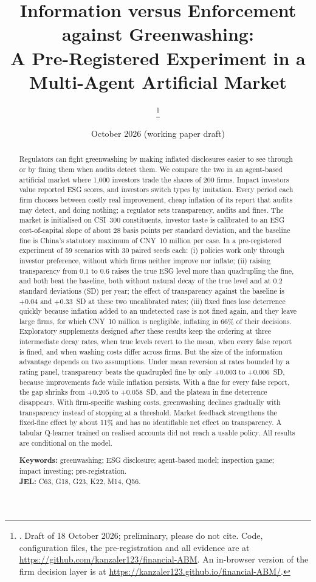 \documentclass[11pt]{article}
\title{Information versus Enforcement against Greenwashing:\\[2pt]
A Pre-Registered Experiment in a Multi-Agent Artificial Market}
\author{\fillin{Author name}\thanks{\fillin{Affiliation and e-mail}. Draft of 18 October 2026; preliminary, please do not cite. Code, configuration files, the pre-registration and all evidence are at \url{https://github.com/kanzaler123/financial-ABM}. An in-browser version of the firm decision layer is at \url{https://kanzaler123.github.io/financial-ABM/}.}}
\date{October 2026 \quad (working paper draft)}
\begin{document}
\maketitle

\begin{abstract}
\noindent Regulators can fight greenwashing by making inflated disclosures easier to see through or by fining them when audits detect them. We compare the two in an agent-based artificial market where 1,000 investors trade the shares of 200 firms. Impact investors value reported ESG scores, and investors switch types by imitation. Every period each firm chooses between costly real improvement, cheap inflation of its report that audits may detect, and doing nothing; a regulator sets transparency, audits and fines. The market is initialised on CSI~300 constituents, investor taste is calibrated to an ESG cost-of-capital slope of about 28 basis points per standard deviation, and the baseline fine is China's statutory maximum of CNY~10 million per case. In a pre-registered experiment of 59 scenarios with 30 paired seeds each: (i) policies work only through investor preference, without which firms neither improve nor inflate; (ii) raising transparency from 0.1 to 0.6 raises the true ESG level more than quadrupling the fine, and both beat the baseline, both without natural decay of the true level and at 0.2 standard deviations (SD) per year; the effect of transparency against the baseline is $+0.04$ and $+0.33$~SD at these two uncalibrated rates; (iii) fixed fines lose deterrence quickly because inflation added to an undetected case is not fined again, and they leave large firms, for which CNY~10 million is negligible, inflating in 66\% of their decisions. Exploratory supplements designed after these results keep the ordering at three intermediate decay rates, when true levels revert to the mean, when every false report is fined, and when washing costs differ across firms. But the size of the information advantage depends on two assumptions. Under mean reversion at rates bounded by a rating panel, transparency beats the quadrupled fine by only $+0.003$ to $+0.006$~SD, because improvements fade while inflation persists. With a fine for every false report, the gap shrinks from $+0.205$ to $+0.058$~SD, and the plateau in fine deterrence disappears. With firm-specific washing costs, greenwashing declines gradually with transparency instead of stopping at a threshold. Market feedback strengthens the fixed-fine effect by about 11\% and has no identifiable net effect on transparency. A tabular Q-learner trained on realised accounts did not reach a usable policy. All results are conditional on the model.

\medskip
\noindent\textbf{Keywords:} greenwashing; ESG disclosure; agent-based model; inspection game; impact investing; pre-registration.\\
\noindent\textbf{JEL:} C63, G18, G23, K22, M14, Q56.
\end{abstract}
\end{document}
